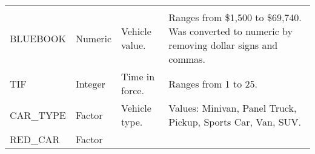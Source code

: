 \documentclass[]{article}
\begin{document}
\begin{longtable}[]{@{}llll@{}}
\begin{minipage}[t]{0.28\columnwidth}
\end{minipage}\tabularnewline
\begin{minipage}[t]{0.16\columnwidth}\raggedright\strut
BLUEBOOK\strut
\end{minipage} & \begin{minipage}[t]{0.12\columnwidth}\raggedright\strut
Numeric\strut
\end{minipage} & \begin{minipage}[t]{0.28\columnwidth}\raggedright\strut
Vehicle value.\strut
\end{minipage} & \begin{minipage}[t]{0.28\columnwidth}\raggedright\strut
Ranges from \$1,500 to \$69,740. Was converted to numeric by removing
dollar signs and commas.\strut
\end{minipage}\tabularnewline
\begin{minipage}[t]{0.16\columnwidth}\raggedright\strut
TIF\strut
\end{minipage} & \begin{minipage}[t]{0.12\columnwidth}\raggedright\strut
Integer\strut
\end{minipage} & \begin{minipage}[t]{0.28\columnwidth}\raggedright\strut
Time in force.\strut
\end{minipage} & \begin{minipage}[t]{0.28\columnwidth}\raggedright\strut
Ranges from 1 to 25.\strut
\end{minipage}\tabularnewline
\begin{minipage}[t]{0.16\columnwidth}\raggedright\strut
CAR\_TYPE\strut
\end{minipage} & \begin{minipage}[t]{0.12\columnwidth}\raggedright\strut
Factor\strut
\end{minipage} & \begin{minipage}[t]{0.28\columnwidth}\raggedright\strut
Vehicle type.\strut
\end{minipage} & \begin{minipage}[t]{0.28\columnwidth}\raggedright\strut
Values: Minivan, Panel Truck, Pickup, Sports Car, Van, SUV.\strut
\end{minipage}\tabularnewline
\begin{minipage}[t]{0.16\columnwidth}\raggedright\strut
RED\_CAR\strut
\end{minipage} & \begin{minipage}[t]{0.12\columnwidth}\raggedright\strut
Factor\strut
\end{minipage} & \begin{minipage}[t]{0.28\columnwidth}\raggedright\strut

\end{minipage}
\end{longtable}
\end{document}
